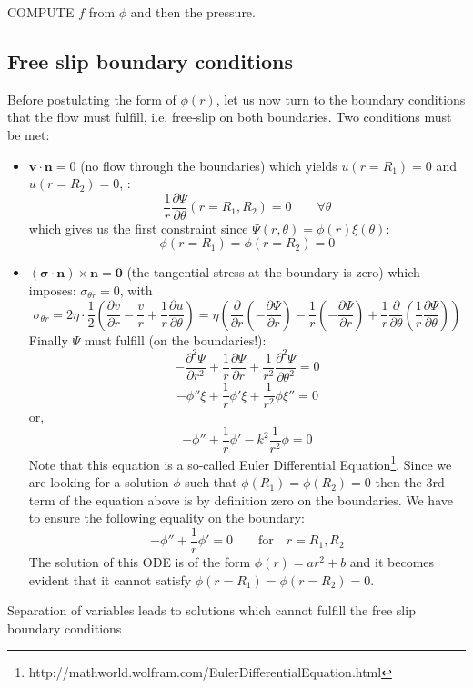 COMPUTE $f$ from $\phi$ and then the pressure.


\subsection*{Free slip boundary conditions}

Before postulating the form of $\phi(r)$, let us now turn to the boundary conditions that the flow must fulfill, i.e. free-slip on both boundaries.
Two conditions must be met:

\begin{itemize}
\item ${\bm v} \cdot {\bm n}=0$ (no flow through the boundaries) which yields $u(r=R_1)=0$ and $u(r=R_2)=0$, :
\[
\frac{1}{r}\frac{\partial \Psi}{\partial \theta} (r=R_1,R_2)=0   \quad\quad \forall \theta
\]
which gives us the first constraint since $\Psi(r,\theta)=\phi(r)\xi(\theta)$:
\[
\phi(r=R_1)=\phi(r=R_2)=0  
\]
\item $({\bm \sigma} \cdot {\bm n}) \times {\bm n} = {\bm 0} $  (the tangential stress at the boundary is zero)
which imposes: $\sigma_{\theta r}=0$, with
\[
\sigma_{\theta r}=
2 \eta \cdot \frac{1}{2} \left( \frac{\partial v}{\partial r} - \frac{v}{r} + \frac{1}{r} \frac{\partial u}{\partial \theta}    \right)
= \eta \left( \frac{\partial }{\partial r} (- \frac{\partial \Psi}{\partial r}) -
\frac{1}{r} (- \frac{\partial \Psi}{\partial r}) + \frac{1}{r} \frac{\partial }{\partial \theta} (\frac{1}{r}\frac{\partial \Psi}{\partial \theta})    \right)
\]
Finally $\Psi$ must fulfill (on the boundaries!):
\[
-\frac{\partial^2 \Psi}{\partial r^2} + \frac{1}{r}  \frac{\partial \Psi}{\partial r} + \frac{1}{r^2} \frac{\partial^2 \Psi}{\partial \theta^2}=0
\]
\[
- \phi'' \xi + \frac{1}{r} \phi' \xi +  \frac{1}{r^2}  \phi \xi'' = 0
\]
or, 
\[
- \phi''  + \frac{1}{r} \phi'  -k^2  \frac{1}{r^2}  \phi  = 0
\]
Note that this equation is a so-called Euler Differential 
Equation\footnote{http://mathworld.wolfram.com/EulerDifferentialEquation.html}.
Since we are looking for a solution $\phi$ such that $\phi(R_1)=\phi(R_2)=0 $ then 
the 3rd term of the equation above is by definition zero on the boundaries.
We have to ensure the following equality on the boundary:
\[
- \phi''  + \frac{1}{r} \phi'   = 0\quad\quad \text{for} \quad r=R_1,R_2
\]
The solution of this ODE is of the form $\phi(r)=ar^2+b$ and it becomes 
evident that it cannot satisfy $\phi(r=R_1)=\phi(r=R_2)=0$.




\end{itemize}

{\color{red} Separation of variables leads to solutions which cannot fulfill the free slip 
boundary conditions}








